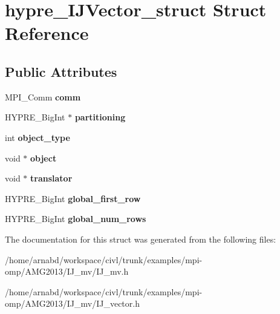 \hypertarget{structhypre__IJVector__struct}{}\section{hypre\+\_\+\+I\+J\+Vector\+\_\+struct Struct Reference}
\label{structhypre__IJVector__struct}
\subsection*{Public Attributes}
\begin{DoxyCompactItemize}
\item 
\hypertarget{structhypre__IJVector__struct_ab41bff8dec85e007fb1a5910e8bb6f69}{}M\+P\+I\+\_\+\+Comm {\bfseries comm}\label{structhypre__IJVector__struct_ab41bff8dec85e007fb1a5910e8bb6f69}

\item 
\hypertarget{structhypre__IJVector__struct_a412ca73958a6d7338ab0dd77f4dcc576}{}H\+Y\+P\+R\+E\+\_\+\+Big\+Int $\ast$ {\bfseries partitioning}\label{structhypre__IJVector__struct_a412ca73958a6d7338ab0dd77f4dcc576}

\item 
\hypertarget{structhypre__IJVector__struct_a8ea96041e724fd9fd17de9e6b51356de}{}int {\bfseries object\+\_\+type}\label{structhypre__IJVector__struct_a8ea96041e724fd9fd17de9e6b51356de}

\item 
\hypertarget{structhypre__IJVector__struct_ad42a5e3ebdb99c2adbf398a9610ca9fa}{}void $\ast$ {\bfseries object}\label{structhypre__IJVector__struct_ad42a5e3ebdb99c2adbf398a9610ca9fa}

\item 
\hypertarget{structhypre__IJVector__struct_a7091d6097df3b45439f105c424c987b7}{}void $\ast$ {\bfseries translator}\label{structhypre__IJVector__struct_a7091d6097df3b45439f105c424c987b7}

\item 
\hypertarget{structhypre__IJVector__struct_ae0bacd6e085f61a052b6b9b35e403166}{}H\+Y\+P\+R\+E\+\_\+\+Big\+Int {\bfseries global\+\_\+first\+\_\+row}\label{structhypre__IJVector__struct_ae0bacd6e085f61a052b6b9b35e403166}

\item 
\hypertarget{structhypre__IJVector__struct_a1fa3637bde6af008da01ac1f639a2986}{}H\+Y\+P\+R\+E\+\_\+\+Big\+Int {\bfseries global\+\_\+num\+\_\+rows}\label{structhypre__IJVector__struct_a1fa3637bde6af008da01ac1f639a2986}

\end{DoxyCompactItemize}


The documentation for this struct was generated from the following files\+:\begin{DoxyCompactItemize}
\item 
/home/arnabd/workspace/civl/trunk/examples/mpi-\/omp/\+A\+M\+G2013/\+I\+J\+\_\+mv/I\+J\+\_\+mv.\+h\item 
/home/arnabd/workspace/civl/trunk/examples/mpi-\/omp/\+A\+M\+G2013/\+I\+J\+\_\+mv/I\+J\+\_\+vector.\+h\end{DoxyCompactItemize}
